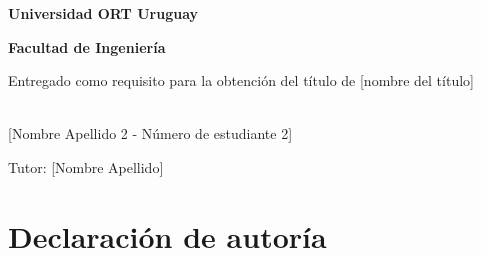 \documentclass[12pt,a4paper,oneside]{book}
\begin{document}
\vspace*{\fill}

\begin{center}

\begin{Large}
\textbf{Universidad ORT Uruguay}

\textbf{Facultad de Ingeniería}
\vspace{5cm}
\end{Large}

\begin{huge}
\end{huge} 

\vspace{1cm}

Entregado como requisito para la obtención del título de [nombre del título]
\vspace{2cm}

\begin{Large}
\\

[Nombre Apellido 2 - Número de estudiante 2]
\vspace{2cm}

Tutor: [Nombre Apellido]
\vspace{2cm}
\end{Large}

\begin{large}
\end{large}

\end{center}
\vspace*{\fill}

\thispagestyle{empty}
\newpage




\chapter*{Declaración de autoría}
\end{document}

